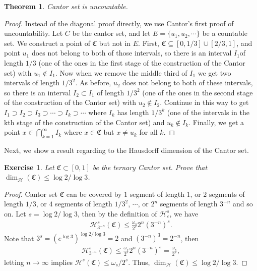 \documentclass[11pt]{book}
\newtheorem{theorem}{Theorem}[chapter]
\newtheorem{exercise}{Exercise}[chapter]
\theoremstyle{definition}
\numberwithin{equation}{chapter}
\def\CC{\mathfrak{C}}
\def\H{{\mathcal H}}
\begin{document}
\medskip

\begin{theorem}
Cantor set is uncountable.
\end{theorem}
\begin{proof}\cite{14} Instead of the diagonal proof directly, we use Cantor's first proof of uncountability. Let $C$ be the cantor set, and let $E = \{u_1,u_2,\cdots\}$ be a countable set. We construct a point of $\CC$ but not in $E$. First, $\CC \subseteq [0,1/3] \cup [2/3,1]$, and point $u_1$ does not belong to both of those intervals, so there is an interval $I_1$of length $1/3$ (one of the ones in the first stage of the construction of the Cantor set) with $u_1 \notin I_1$. Now when we remove the middle third of $I_1$ we get two intervals of length $1/3^2$. As before, $u_2$ does not belong to both of these intervals, so there is an interval $I_2 \subset I_1$ of length $1/3^2$ (one of the ones in the second stage of the construction of the Cantor set) with $u_2 \notin I_2$. Continue in this way to get $I_1 \supset I_2 \supset I_3 \supset \cdots \supset I_k \supset \cdots$ where $I_k$ has length $1/3^k$ (one of the intervals in the kth stage of the construction of the Cantor set) and $u_k \notin I_k$. Finally, we get a point $x \in \bigcap^\infty_{k=1} I_k$ where $x \in \CC$ but $x \neq u_k$ for all $k$.
\end{proof}

\medskip

Next, we show a result regarding to the Hausdorff  dimension of the Cantor set.

\medskip

\begin{exercise}\label{exe_13}
Let $\CC \subset [0,1]$ be the ternary Cantor set. Prove that $\dim_{\H}(\CC) \leq \log 2/\log 3$.
\end{exercise}
\begin{proof}
Cantor set $\CC$ can be covered by $1$ segment of length $1$, or $2$ segments of length $1/3$, or $4$ segments of length $1/3^2$, $\cdots$, or $2^n$ segments of length $3^{-n}$ and so on. Let $s = \log 2/\log 3$, then by the definition of $\H^s_{\varepsilon}$, we have
\begin{align*}
    \H^s_{3^{-n}}(\CC) \leq \frac{\omega_s}{2^s} 2^n \left(3^{-n}\right)^s.
\end{align*}
Note that $3^s = \left(e^{\log 3}\right)^{\log 2/\log 3} = 2$ and $\left(3^{-n}\right)^3 = 2^{-n}$, then 
\begin{align*}
    \H^s_{3^{-n}}(\CC) \leq \frac{\omega_s}{2^s} 2^n \left(3^{-n}\right)^s = \frac{\omega_s}{2^s},
\end{align*}
letting $n \to \infty$ implies $\H^s(\CC) \leq \omega_s / 2^s$. Thus, $\dim_{\H}(\CC) \leq \log 2/\log 3$.
\end{proof}
\end{document}
